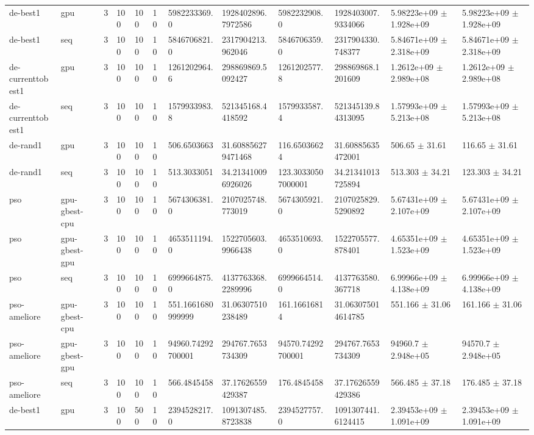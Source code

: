 \begin{table}[t]
\begin{tabular}{llllllllllll}
de-best1 & gpu & 3 & 100 & 100 & 10 & 5982233369.0 & 1928402896.7972586 & 5982232908.0 & 1928403007.9334066 & 5.98223e+09 $\pm$ 1.928e+09 & 5.98223e+09 $\pm$ 1.928e+09 \\
de-best1 & seq & 3 & 100 & 100 & 10 & 5846706821.0 & 2317904213.962046 & 5846706359.0 & 2317904330.748377 & 5.84671e+09 $\pm$ 2.318e+09 & 5.84671e+09 $\pm$ 2.318e+09 \\
de-currenttobest1 & gpu & 3 & 100 & 100 & 10 & 1261202964.6 & 298869869.5092427 & 1261202577.8 & 298869868.1201609 & 1.2612e+09 $\pm$ 2.989e+08 & 1.2612e+09 $\pm$ 2.989e+08 \\
de-currenttobest1 & seq & 3 & 100 & 100 & 10 & 1579933983.8 & 521345168.4418592 & 1579933587.4 & 521345139.84313095 & 1.57993e+09 $\pm$ 5.213e+08 & 1.57993e+09 $\pm$ 5.213e+08 \\
de-rand1 & gpu & 3 & 100 & 100 & 10 & 506.6503663 & 31.608856279471468 & 116.65036624 & 31.60885635472001 & 506.65 $\pm$ 31.61 & 116.65 $\pm$ 31.61 \\
de-rand1 & seq & 3 & 100 & 100 & 10 & 513.3033051 & 34.213410096926026 & 123.30330507000001 & 34.21341013725894 & 513.303 $\pm$ 34.21 & 123.303 $\pm$ 34.21 \\
pso & gpu-gbest-cpu & 3 & 100 & 100 & 10 & 5674306381.0 & 2107025748.773019 & 5674305921.0 & 2107025829.5290892 & 5.67431e+09 $\pm$ 2.107e+09 & 5.67431e+09 $\pm$ 2.107e+09 \\
pso & gpu-gbest-gpu & 3 & 100 & 100 & 10 & 4653511194.0 & 1522705603.9966438 & 4653510693.0 & 1522705577.878401 & 4.65351e+09 $\pm$ 1.523e+09 & 4.65351e+09 $\pm$ 1.523e+09 \\
pso & seq & 3 & 100 & 100 & 10 & 6999664875.0 & 4137763368.2289996 & 6999664514.0 & 4137763580.367718 & 6.99966e+09 $\pm$ 4.138e+09 & 6.99966e+09 $\pm$ 4.138e+09 \\
pso-ameliore & gpu-gbest-cpu & 3 & 100 & 100 & 10 & 551.1661680999999 & 31.06307510238489 & 161.16616814 & 31.063075014614785 & 551.166 $\pm$ 31.06 & 161.166 $\pm$ 31.06 \\
pso-ameliore & gpu-gbest-gpu & 3 & 100 & 100 & 10 & 94960.74292700001 & 294767.7653734309 & 94570.74292700001 & 294767.7653734309 & 94960.7 $\pm$ 2.948e+05 & 94570.7 $\pm$ 2.948e+05 \\
pso-ameliore & seq & 3 & 100 & 100 & 10 & 566.4845458 & 37.17626559429387 & 176.4845458 & 37.17626559429386 & 566.485 $\pm$ 37.18 & 176.485 $\pm$ 37.18 \\
de-best1 & gpu & 3 & 100 & 500 & 10 & 2394528217.0 & 1091307485.8723838 & 2394527757.0 & 1091307441.6124415 & 2.39453e+09 $\pm$ 1.091e+09 & 2.39453e+09 $\pm$ 1.091e+09 \\

\end{tabular}
\end{table}
